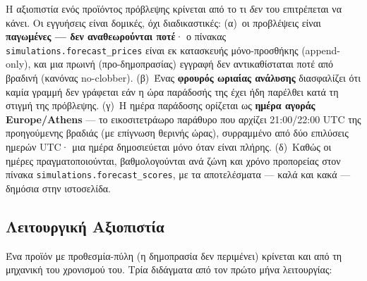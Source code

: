 Η αξιοπιστία ενός προϊόντος πρόβλεψης κρίνεται από το τι \emph{δεν} του επιτρέπεται να κάνει. Οι εγγυήσεις είναι δομικές, όχι διαδικαστικές: (α)~οι προβλέψεις είναι \textbf{παγωμένες --- δεν αναθεωρούνται ποτέ}· ο πίνακας \texttt{simulations.forecast\_prices} είναι εκ κατασκευής μόνο-προσθήκης (append-only), και μια πρωινή (προ-δημοπρασίας) εγγραφή δεν αντικαθίσταται ποτέ από βραδινή (κανόνας no-clobber). (β)~Ένας \textbf{φρουρός ωριαίας ανάλυσης} διασφαλίζει ότι καμία γραμμή δεν γράφεται εάν η ώρα παράδοσής της έχει ήδη παρέλθει κατά τη στιγμή της πρόβλεψης. (γ)~Η ημέρα παράδοσης ορίζεται ως \textbf{ημέρα αγοράς Europe/Athens} --- το εικοσιτετράωρο παράθυρο που αρχίζει 21:00/22:00 UTC της προηγούμενης βραδιάς (με επίγνωση θερινής ώρας), συρραμμένο από δύο επιλύσεις ημερών UTC· μια ημέρα δημοσιεύεται μόνο όταν είναι πλήρης. (δ)~Καθώς οι ημέρες πραγματοποιούνται, βαθμολογούνται ανά ζώνη και χρόνο προπορείας στον πίνακα \texttt{simulations.forecast\_scores}, με τα αποτελέσματα --- καλά και κακά --- δημόσια στην ιστοσελίδα.

\subsection{Λειτουργική Αξιοπιστία}
\label{subsec:operational-reliability}

Ένα προϊόν με προθεσμία-πύλη (η δημοπρασία δεν περιμένει) κρίνεται και από τη μηχανική του χρονισμού του. Τρία διδάγματα από τον πρώτο μήνα λειτουργίας:

